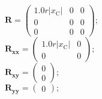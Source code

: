 \documentclass[11pt, oneside]{article}      %
\begin{document}
%
$ \mathbf{R} = \left(\begin{array}{ccc}1.0 r \left|{x_{\mathrm{C}}}\right| & 0 & 0\\0 & 0 & 0\\0 & 0 & 0\end{array}\right) ; $ 
%
\\
%
$ \mathbf{R_{xx}} = \left(\begin{array}{cc}1.0 r \left|{x_{\mathrm{C}}}\right| & 0\\0 & 0\end{array}\right) ; $ 
%
\\
%
$ \mathbf{R_{xy}} = \left(\begin{array}{c}0\\0\end{array}\right) ; $ 
%
\\
%
$ \mathbf{R_{yy}} = \left(\begin{array}{c}0\end{array}\right) ; $ 
%
\\
%
\end{document}
